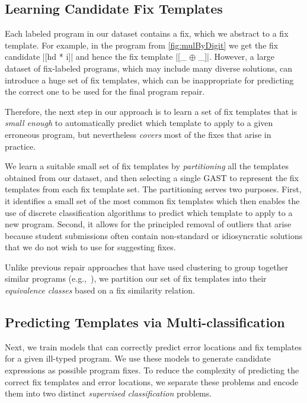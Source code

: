 \subsection{Learning Candidate Fix Templates}
\label{sec:overview:learn}

Each labeled program in our dataset contains a fix, which we abstract to a fix
template. For example, in the \mbd program from \autoref{fig:mulByDigit} we get
the fix candidate |[hd * i]| and hence the fix template |[_ $\oplus$ _]|.
However, a large dataset of fix-labeled programs, which may include many
diverse solutions, can introduce a huge set of fix templates, which can be
inappropriate for predicting the correct one to be used for the final program
repair.

Therefore, the next step in our approach is to learn a set of fix templates
that is \emph{small enough} to automatically predict which template to apply to
a given erroneous program, but nevertheless \emph{covers} most of the fixes that
arise in practice.

 We learn a suitable small set of fix
templates by \emph{partitioning} all the templates obtained from our dataset,
and then selecting a single GAST to represent the fix templates from each fix
template set.
%
The partitioning serves two purposes.
%
First, it identifies a small set of the most common fix templates which then
enables the use of discrete classification algorithms to predict which template
to apply to a new program.
%
Second, it allows for the principled removal of outliers that arise because
student submissions often contain non-standard or idiosyncratic solutions that
we do not wish to use for suggesting fixes.

Unlike previous repair approaches that have used clustering to group together
similar programs (e.g.,~\citep{Wang_2018, Gulwani_2018}), we partition our set of
fix templates into their \emph{equivalence classes} based on a fix similarity
relation.


\subsection{Predicting Templates via Multi-classification}
\label{sec:overview:predict}

Next, we train models that can correctly predict error locations and fix
templates for a given ill-typed program. We use these models to generate
candidate expressions as possible program fixes. To reduce the
complexity of predicting the correct fix templates and error locations, we
separate these problems and encode them into two distinct \emph{supervised
classification} problems.

